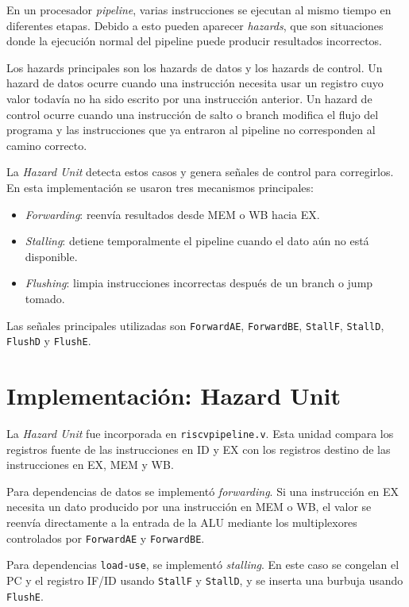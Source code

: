 En un procesador \textit{pipeline}, varias instrucciones se ejecutan al mismo tiempo en diferentes etapas. Debido a esto pueden aparecer \textit{hazards}, que son situaciones donde la ejecución normal del pipeline puede producir resultados incorrectos.

Los hazards principales son los hazards de datos y los hazards de control. Un hazard de datos ocurre cuando una instrucción necesita usar un registro cuyo valor todavía no ha sido escrito por una instrucción anterior. Un hazard de control ocurre cuando una instrucción de salto o branch modifica el flujo del programa y las instrucciones que ya entraron al pipeline no corresponden al camino correcto.

La \textit{Hazard Unit} detecta estos casos y genera señales de control para corregirlos. En esta implementación se usaron tres mecanismos principales:

\begin{itemize}
    \item \textit{Forwarding}: reenvía resultados desde MEM o WB hacia EX.
    \item \textit{Stalling}: detiene temporalmente el pipeline cuando el dato aún no está disponible.
    \item \textit{Flushing}: limpia instrucciones incorrectas después de un branch o jump tomado.
\end{itemize}

Las señales principales utilizadas son \texttt{ForwardAE}, \texttt{ForwardBE}, \texttt{StallF}, \texttt{StallD}, \texttt{FlushD} y \texttt{FlushE}.

\section{Implementación: Hazard Unit}

La \textit{Hazard Unit} fue incorporada en \texttt{riscvpipeline.v}. Esta unidad compara los registros fuente de las instrucciones en ID y EX con los registros destino de las instrucciones en EX, MEM y WB.

Para dependencias de datos se implementó \textit{forwarding}. Si una instrucción en EX necesita un dato producido por una instrucción en MEM o WB, el valor se reenvía directamente a la entrada de la ALU mediante los multiplexores controlados por \texttt{ForwardAE} y \texttt{ForwardBE}.

Para dependencias \texttt{load-use}, se implementó \textit{stalling}. En este caso se congelan el PC y el registro IF/ID usando \texttt{StallF} y \texttt{StallD}, y se inserta una burbuja usando \texttt{FlushE}.

